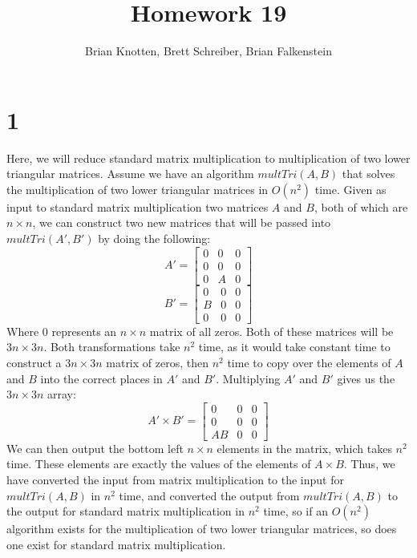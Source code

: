 \documentclass[letterpaper,notitlepage,twoside]{article}
\begin{document}
\title{Homework 19}
\author{Brian Knotten, Brett Schreiber, Brian Falkenstein}
\maketitle
\section*{1}
Here, we will reduce standard matrix multiplication to multiplication of two lower triangular matrices. Assume we have an algorithm $multTri(A, B)$ that solves the multiplication of two lower triangular matrices in $O(n^2)$ time. Given as input to standard matrix multiplication two matrices $A$ and $B$, both of which are $n\times n$, we can construct two new matrices that will be passed into $multTri(A', B')$ by doing the following: 
\[
A' = 
\begin{bmatrix}
    0 & 0 & 0 \\
    0 & 0 & 0 \\
    0 & A & 0 
\end{bmatrix}
\]
\[
B' = 
\begin{bmatrix}
    0 & 0 & 0 \\
    B & 0 & 0 \\
    0 & 0 & 0 
\end{bmatrix}
\]
Where $0$ represents an $n \times n$ matrix of all zeros. Both of these matrices will be $3n\times 3n$. Both transformations take $n^2$ time, as it would take constant time to construct a $3n\times 3n$ matrix of zeros, then $n^2$ time to copy over the elements of $A$ and $B$ into the correct places in $A'$ and $B'$. Multiplying $A'$ and $B'$ gives us the $3n \times 3n$ array: \\
\[
A' \times B' = 
\begin{bmatrix}
    0 & 0 & 0 \\
    0 & 0 & 0 \\
    AB & 0 & 0 
\end{bmatrix}
\]
We can then output the bottom left $n\times n$ elements in the matrix, which takes $n^2$ time. These elements are exactly the values of the elements of $A\times B$. Thus, we have converted the input from matrix multiplication to the input for $multTri(A,B)$ in $n^2$ time, and converted the output from $multTri(A,B)$ to the output for standard matrix multiplication in $n^2$ time, so if an $O(n^2)$ algorithm exists for the multiplication of two lower triangular matrices, so does one exist for standard matrix multiplication. 
\end{document}
